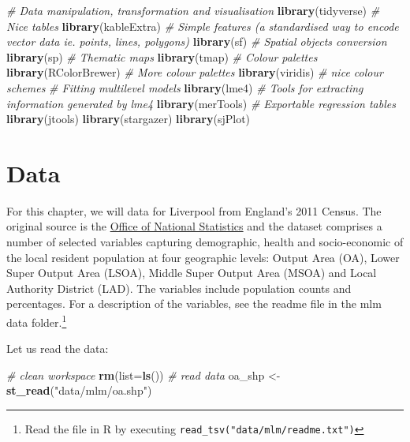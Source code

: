 \documentclass[]{book}
\newenvironment{Shaded}{\begin{snugshade}}{\end{snugshade}}
\newcommand{\KeywordTok}[1]{\textcolor[rgb]{0.13,0.29,0.53}{\textbf{#1}}}
\newcommand{\DataTypeTok}[1]{\textcolor[rgb]{0.13,0.29,0.53}{#1}}
\newcommand{\StringTok}[1]{\textcolor[rgb]{0.31,0.60,0.02}{#1}}
\newcommand{\CommentTok}[1]{\textcolor[rgb]{0.56,0.35,0.01}{\textit{#1}}}
\newcommand{\NormalTok}[1]{#1}
\begin{document}
\begin{Shaded}
\begin{Highlighting}[]
\CommentTok{# Data manipulation, transformation and visualisation}
\KeywordTok{library}\NormalTok{(tidyverse)}
\CommentTok{# Nice tables}
\KeywordTok{library}\NormalTok{(kableExtra)}
\CommentTok{# Simple features (a standardised way to encode vector data ie. points, lines, polygons)}
\KeywordTok{library}\NormalTok{(sf) }
\CommentTok{# Spatial objects conversion}
\KeywordTok{library}\NormalTok{(sp) }
\CommentTok{# Thematic maps}
\KeywordTok{library}\NormalTok{(tmap) }
\CommentTok{# Colour palettes}
\KeywordTok{library}\NormalTok{(RColorBrewer) }
\CommentTok{# More colour palettes}
\KeywordTok{library}\NormalTok{(viridis) }\CommentTok{# nice colour schemes}
\CommentTok{# Fitting multilevel models}
\KeywordTok{library}\NormalTok{(lme4)}
\CommentTok{# Tools for extracting information generated by lme4}
\KeywordTok{library}\NormalTok{(merTools)}
\CommentTok{# Exportable regression tables}
\KeywordTok{library}\NormalTok{(jtools)}
\KeywordTok{library}\NormalTok{(stargazer)}
\KeywordTok{library}\NormalTok{(sjPlot)}
\end{Highlighting}
\end{Shaded}

\section{Data}\label{data-4}

For this chapter, we will data for Liverpool from England's 2011 Census.
The original source is the
\href{https://www.nomisweb.co.uk/home/census2001.asp}{Office of National
Statistics} and the dataset comprises a number of selected variables
capturing demographic, health and socio-economic of the local resident
population at four geographic levels: Output Area (OA), Lower Super
Output Area (LSOA), Middle Super Output Area (MSOA) and Local Authority
District (LAD). The variables include population counts and percentages.
For a description of the variables, see the readme file in the mlm data
folder.\footnote{Read the file in R by executing
  \texttt{read\_tsv("data/mlm/readme.txt")}}

Let us read the data:

\begin{Shaded}
\begin{Highlighting}[]
\CommentTok{# clean workspace}
\KeywordTok{rm}\NormalTok{(}\DataTypeTok{list=}\KeywordTok{ls}\NormalTok{())}
\CommentTok{# read data}
\NormalTok{oa_shp <-}\StringTok{ }\KeywordTok{st_read}\NormalTok{(}\StringTok{"data/mlm/oa.shp"}\NormalTok{)}
\end{Highlighting}
\end{Shaded}
\end{document}
